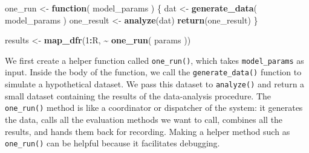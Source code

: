\documentclass[
]{book}
\newenvironment{Shaded}{\begin{snugshade}}{\end{snugshade}}
\newcommand{\ControlFlowTok}[1]{\textcolor[rgb]{0.13,0.29,0.53}{\textbf{#1}}}
\newcommand{\DecValTok}[1]{\textcolor[rgb]{0.00,0.00,0.81}{#1}}
\newcommand{\FunctionTok}[1]{\textcolor[rgb]{0.13,0.29,0.53}{\textbf{#1}}}
\newcommand{\NormalTok}[1]{#1}
\newcommand{\OtherTok}[1]{\textcolor[rgb]{0.56,0.35,0.01}{#1}}
\newcommand{\SpecialCharTok}[1]{\textcolor[rgb]{0.81,0.36,0.00}{\textbf{#1}}}
\begin{document}
\begin{Shaded}
\begin{Highlighting}[]
\NormalTok{one\_run }\OtherTok{\textless{}{-}} \ControlFlowTok{function}\NormalTok{( model\_params ) \{}
\NormalTok{  dat }\OtherTok{\textless{}{-}} \FunctionTok{generate\_data}\NormalTok{( model\_params )}
\NormalTok{  one\_result }\OtherTok{\textless{}{-}} \FunctionTok{analyze}\NormalTok{(dat)}
  \FunctionTok{return}\NormalTok{(one\_result)}
\NormalTok{\}}

\NormalTok{results }\OtherTok{\textless{}{-}} \FunctionTok{map\_dfr}\NormalTok{(}\DecValTok{1}\SpecialCharTok{:}\NormalTok{R, }\SpecialCharTok{\textasciitilde{}} \FunctionTok{one\_run}\NormalTok{( params ))}
\end{Highlighting}
\end{Shaded}

We first create a helper function called \texttt{one\_run()}, which takes \texttt{model\_params} as input.
Inside the body of the function, we call the \texttt{generate\_data()} function to simulate a hypothetical dataset.
We pass this dataset to \texttt{analyze()} and return a small dataset containing the results of the data-analysis procedure.
The \texttt{one\_run()} method is like a coordinator or dispatcher of the system: it generates the data, calls all the evaluation methods we want to call, combines all the results, and hands them back for recording.
Making a helper method such as \texttt{one\_run()} can be helpful because it facilitates debugging.
\end{document}
